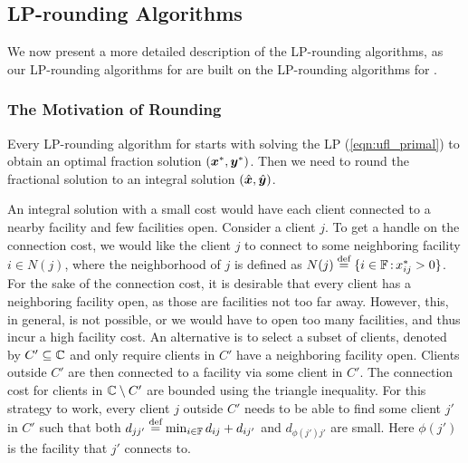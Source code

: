 \documentclass[oneside,final]{ucr}
\begin{document}
\subsection{LP-rounding Algorithms}
We now present a more detailed description of the
LP-rounding algorithms, as our LP-rounding algorithms for
{\FTFP} are built on the LP-rounding algorithms for {\UFL}.

\subsubsection{The Motivation of Rounding}
Every LP-rounding algorithm for {\UFL} starts with solving
the LP (\ref{eqn:ufl_primal}) to obtain an optimal fraction
solution $(\boldsymbol{x}^\ast,\boldsymbol{y}^\ast)$. Then we need to round the
fractional solution to an integral solution
$(\hat{\boldsymbol{x}},\hat{\boldsymbol{y}})$.

An integral solution with a small cost would have each
client connected to a nearby facility and few facilities
open. Consider a client $j$. To get a handle on the
connection cost, we would like the client $j$ to connect to
some neighboring facility $i\in N(j)$, where the
neighborhood of $j$ is defined as $N(j) \stackrel{\text{def}}{=}
\{i\in\mathbb{F} {\,:\,} x_{ij}^\ast > 0\}$. For the sake
of the connection cost, it is desirable that every client
has a neighboring facility open, as those are facilities not
too far away. However, this, in general, is not possible, or
we would have to open too many facilities, and thus incur a
high facility cost. An alternative is to select a subset of
clients, denoted by $C' \subseteq \mathbb{C}$ and only
require clients in $C'$ have a neighboring facility
open. Clients outside $C'$ are then connected to a facility
via some client in $C'$. The connection cost for clients in
$\mathbb{C} \setminus C'$ are bounded using the triangle
inequality. For this strategy to work, every client $j$
outside $C'$ needs to be able to find some client $j'$ in
$C'$ such that both $d_{jj'} \stackrel{\text{def}}{=} \min_{i\in \mathbb{F}}
d_{ij} + d_{ij'}$ and $d_{\phi(j') j'}$ are small. Here
$\phi(j')$ is the facility that $j'$ connects to.
\end{document}

